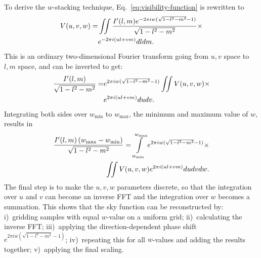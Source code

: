 \documentclass[useAMS,usenatbib]{mn2e}
\begin{document}
To derive the $w$-stacking technique, Eq.~\eqref{eq:visibility-function} is rewritten to
\begin{align}\notag
V(u,v,w) = & \iint \frac{I'(l,m) e^{-2\pi i w(\sqrt{1-l^2-m^2}-1)}}{\sqrt{1-l^2-m^2}} \times \\ \notag
& e^{-2\pi i \left(ul + vm\right)} dl dm.
\end{align}
This is an ordinary two-dimensional Fourier transform going from $u,v$ space to $l,m$ space, and can be inverted to get:
\begin{align}\notag
\frac{I'(l,m)}{\sqrt{1-l^2-m^2}} = & e^{2\pi i w(\sqrt{1-l^2-m^2}-1)} \iint V(u,v,w) \times \\ \notag
& e^{2\pi i \left(ul + vm\right)} du dv.
\end{align}
Integrating both sides over $w_{\min}$ to $w_{\max}$, the minimum and maximum value of $w$, results in
\begin{align}\notag
\frac{I'(l,m)\left(w_{\max} - w_{\min}\right)}{\sqrt{1-l^2-m^2}} = \int\limits_{w_{\min}}^{w_{\max}} e^{2\pi i w(\sqrt{1-l^2-m^2}-1)} \times \\ \label{eq:wstacking}
\iint V(u,v,w)  e^{2\pi i \left(ul + vm\right)} du dv dw.
\end{align}
The final step is to make the $u,v,w$ parameters discrete, so that the integration over $u$ and $v$ can become an inverse FFT and the integration over $w$ becomes a summation. This shows that the sky function can be reconstructed by: i)~gridding samples with equal $w$-value on a uniform grid; ii)~calculating the inverse FFT; iii)~applying the direction-dependent phase shift $e^{2\pi i w(\sqrt{1-l^2-m^2}-1)}$; iv)~repeating this for all $w$-values and adding the results together; v)~applying the final scaling.
\end{document}
